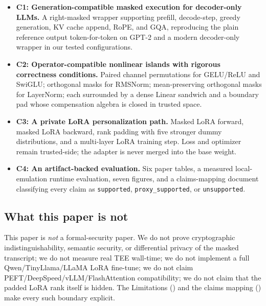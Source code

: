 \begin{itemize}[leftmargin=*, nosep]
  \item \textbf{C1: Generation-compatible masked execution for decoder-only LLMs.} A right-masked wrapper supporting prefill, decode-step, greedy generation, KV cache append, RoPE, and GQA, reproducing the plain reference output token-for-token on GPT-2 and a modern decoder-only wrapper in our tested configurations.
  \item \textbf{C2: Operator-compatible nonlinear islands with rigorous correctness conditions.} Paired channel permutations for GELU/ReLU and SwiGLU; orthogonal masks for RMSNorm; mean-preserving orthogonal masks for LayerNorm; each surrounded by a dense Linear sandwich and a boundary pad whose compensation algebra is closed in trusted space.
  \item \textbf{C3: A private LoRA personalization path.} Masked LoRA forward, masked LoRA backward, rank padding with five stronger dummy distributions, and a multi-layer LoRA training step. Loss and optimizer remain trusted-side; the adapter is never merged into the base weight.
  \item \textbf{C4: An artifact-backed evaluation.} Six paper tables, a measured local-emulation runtime evaluation, seven figures, and a claims-mapping document classifying every claim as \texttt{supported}, \texttt{proxy\_supported}, or \texttt{unsupported}.
\end{itemize}

\subsection{What this paper is not}
This paper is \emph{not} a formal-security paper. We do not prove cryptographic indistinguishability, semantic security, or differential privacy of the masked transcript; we do not measure real TEE wall-time; we do not implement a full Qwen/TinyLlama/LLaMA LoRA fine-tune; we do not claim PEFT/DeepSpeed/vLLM/FlashAttention compatibility; we do not claim that the padded LoRA rank itself is hidden. The Limitations () and the claims mapping () make every such boundary explicit.
